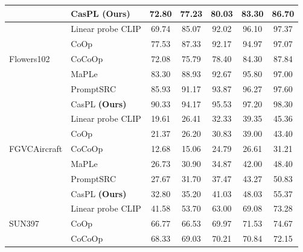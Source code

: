 \begin{table}[t!]
{\begin{tabular}{ll|ccccc}
                                      \rowcolor{tablecolor}
                                       & CasPL \textbf{(Ours) }    &72.80 	&77.23 	&80.03 	&83.30 	&86.70     \\
        \hline
        \multirow{5}{*}{Flowers102}    & Linear probe CLIP      & 69.74	&85.07	&92.02	&96.10	&97.37\\
                                       & CoOp                   & 77.53	&87.33	&92.17	&94.97	&97.07\\
                                       & CoCoOp                    &72.08	&75.79	&78.40	&84.30	&87.84\\
                                       & MaPLe                  & 83.30	&88.93	&92.67&	95.80&	97.00\\
                                       & PromptSRC            & 85.93	&91.17	&93.87	&96.27	&97.60\\
                                       \rowcolor{tablecolor}
                                        & CasPL \textbf{(Ours) }  &90.33 &94.17  &95.53  &97.20  &98.30     \\
                                       \hline
        \multirow{5}{*}{FGVCAircraft}  & Linear probe CLIP       & 19.61	&26.41	&32.33	&39.35&	45.36\\
                                       & CoOp                     & 21.37&	26.20	&30.83	&39.00	&43.40\\
                                       & CoCoOp                   & 12.68	&15.06	&24.79	&26.61	&31.21\\
                                       & MaPLe                  & 26.73	&30.90	& 34.87&	42.00&	48.40\\
                                       & PromptSRC           & 27.67	&31.70	&37.47&	43.27	&50.83\\
                                       \rowcolor{tablecolor}
                                         & CasPL \textbf{(Ours) }   &32.80 &35.20 	&41.03 	&48.03 	&55.37  \\
                                       \hline
        \multirow{5}{*}{SUN397}        & Linear probe CLIP          & 41.58	&53.70	&63.00	&69.08	&73.28\\
                                       & CoOp                     & 66.77	&66.53	&69.97	&71.53	&74.67\\
                                       & CoCoOp                   & 68.33	&69.03&	70.21	&70.84	&72.15\\

\end{tabular}}
\end{table}
